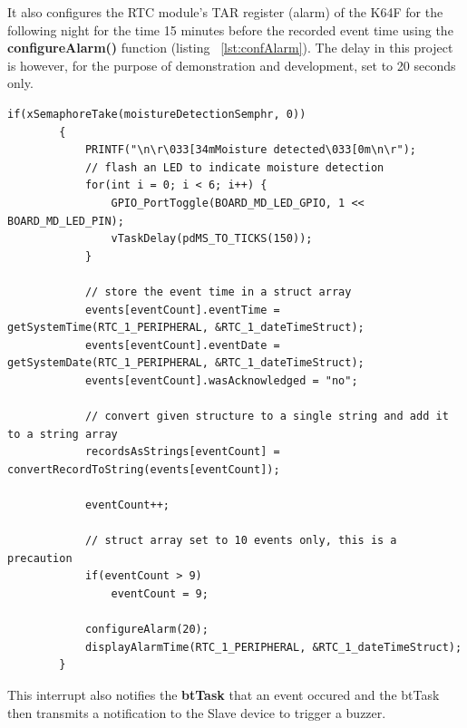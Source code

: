 \documentclass[12pt,a4paper]{article}
\begin{document}
        It also configures the RTC module's TAR register (alarm) of the K64F for the following night for the time 15 minutes before the recorded event time using the {\bfseries configureAlarm()} function (listing ~\ref{lst:confAlarm}). The delay in this project is however, for the purpose of demonstration and development, set to 20 seconds only. 
        \begin{lstlisting}[label={lst:mdSemaphore}, caption=Moisture Detection Semaphore]
        if(xSemaphoreTake(moistureDetectionSemphr, 0))
        {
            PRINTF("\n\r\033[34mMoisture detected\033[0m\n\r");
            // flash an LED to indicate moisture detection
            for(int i = 0; i < 6; i++) {
                GPIO_PortToggle(BOARD_MD_LED_GPIO, 1 << BOARD_MD_LED_PIN);
                vTaskDelay(pdMS_TO_TICKS(150));
            }

            // store the event time in a struct array
            events[eventCount].eventTime = getSystemTime(RTC_1_PERIPHERAL, &RTC_1_dateTimeStruct);
            events[eventCount].eventDate = getSystemDate(RTC_1_PERIPHERAL, &RTC_1_dateTimeStruct);
            events[eventCount].wasAcknowledged = "no";

            // convert given structure to a single string and add it to a string array
            recordsAsStrings[eventCount] = convertRecordToString(events[eventCount]);

            eventCount++;

            // struct array set to 10 events only, this is a precaution
            if(eventCount > 9)
                eventCount = 9;

            configureAlarm(20);
            displayAlarmTime(RTC_1_PERIPHERAL, &RTC_1_dateTimeStruct);
		}	 
        \end{lstlisting}
        This interrupt also notifies the {\bfseries btTask} that an event occured and the btTask then transmits a notification to the Slave device to trigger a buzzer.
        
\end{document}

